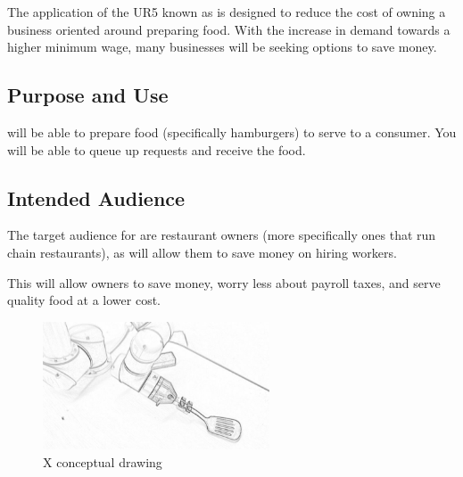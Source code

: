 The application of the UR5 known as \productname{} is designed to reduce the cost of owning a business oriented around preparing food. With the increase in demand towards a higher minimum wage, many businesses will be seeking options to save money.

\subsection{Purpose and Use}
\productname{} will be able to prepare food (specifically hamburgers) to serve to a consumer. You will be able to queue up requests and receive the food.  

\subsection{Intended Audience}
The target audience for \productname{} are restaurant owners (more specifically ones that run chain restaurants), as \productname{} will allow them to save money on hiring workers.

This will allow owners to save money, worry less about payroll taxes, and serve quality food at a lower cost.

\begin{figure}[h!]
	\centering
   	\includegraphics[width=0.60\textwidth]{images/test_image}
    \caption{X conceptual drawing}
\end{figure}
